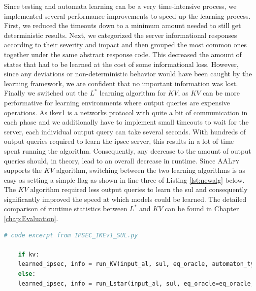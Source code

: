 Since testing and automata learning can be a very time-intensive process, we implemented several performance improvements to speed up the learning process. First, we reduced the timeouts down to a minimum amount needed to still get deterministic results. Next, we categorized the server informational responses according to their severity and impact and then grouped the most common ones together under the same abstract response code. This decreased the amount of states that had to be learned at the cost of some informational loss. However, since any deviations or non-deterministic behavior would have been caught by the learning framework, we are confident that no important information was lost. Finally we switched out the $L^*$ learning algorithm for $KV$, as $KV$ can be more performative for learning environments where output queries are expensive operations. As \ac{ike}v1 is a networks protocol with quite a bit of communication in each phase and we additionally have to implement small timeouts to wait for the server, each individual output query can take several seconds. With hundreds of output queries required to learn the \ac{ipsec} server, this results in a lot of time spent running the algorithm. Consequently, any decrease to the amount of output queries should, in theory, lead to an overall decrease in runtime. Since \textsc{AALpy} supports the $KV$ algorithm, switching between the two learning algorithms is as easy as setting a simple flag as shown in line three of Listing \ref{lst:newalg} below. The $KV$ algorithm required less output queries to learn the \ac{sul} and consequently significantly improved the speed at which models could be learned. The detailed comparison of runtime statistics between $L^*$ and $KV$ can be found in Chapter \ref{chap:Evaluation}.

\begin{lstlisting}[float=ht, caption=Switching Learning Algorithms, label=lst:newalg, language=python]
	# code excerpt from IPSEC_IKEv1_SUL.py
	
	if kv:
	learned_ipsec, info = run_KV(input_al, sul, eq_oracle, automaton_type='mealy', cex_processing='rs')
	else:
	learned_ipsec, info = run_Lstar(input_al, sul, eq_oracle=eq_oracle, automaton_type='mealy', cache_and_non_det_check=True)
\end{lstlisting}


